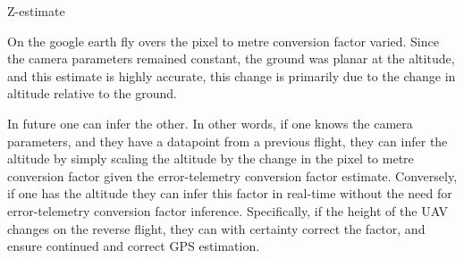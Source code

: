 Z-estimate

On the google earth fly overs the pixel to metre conversion factor varied. 
Since the camera parameters remained constant, the ground was planar at the altitude, and this estimate is highly accurate, this change is primarily due to the change in altitude relative to the ground. 

In future one can infer the other. In other words, if one knows the camera parameters, and they have a datapoint from a previous flight, they can infer the altitude by simply scaling the altitude by the change in the pixel to metre conversion factor given the error-telemetry conversion factor estimate.
Conversely, if one has the altitude they can infer this factor in real-time without the need for error-telemetry conversion factor inference. Specifically, if the height of the UAV changes on the reverse flight, they can with certainty correct the factor, and ensure continued and correct GPS estimation. 

